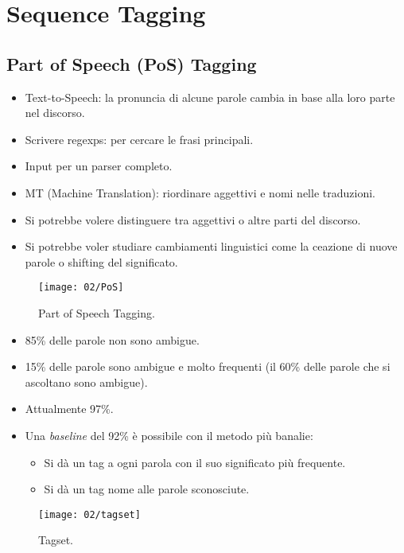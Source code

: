 \chapter{Sequence Tagging}

\section{Part of Speech (PoS) Tagging}



\begin{itemize}
  \item Text-to-Speech: la pronuncia di alcune parole cambia in base alla loro parte nel discorso. 
  \item Scrivere regexps: per cercare le frasi principali. 
  \item Input per un parser completo. 
  \item MT (Machine Translation): riordinare aggettivi e nomi nelle traduzioni. 
  \item Si potrebbe volere distinguere tra aggettivi o altre parti del discorso. 
  \item Si potrebbe voler studiare cambiamenti linguistici come la ceazione di nuove parole o shifting del significato.
\end{itemize}

\begin{figure}[h]
    \centering
    \texttt{[image: 02/PoS]}
    \caption{Part of Speech Tagging.}
\end{figure}


\begin{itemize}
  \item 85\% delle parole non sono ambigue. 
  \item 15\% delle parole sono ambigue e molto frequenti (il 60\% delle parole che si ascoltano sono ambigue).
\end{itemize}


\begin{itemize}
  \item Attualmente 97\%. 
  \item Una \textit{baseline} del 92\% è possibile con il metodo più banalie:
    \begin{itemize}
      \item Si dà un tag a ogni parola con il suo significato più frequente. 
      \item Si dà un tag nome alle parole sconosciute.
    \end{itemize}
\end{itemize}

\begin{figure}[h]
    \centering
    \texttt{[image: 02/tagset]}
    \caption{Tagset.}
\end{figure}


